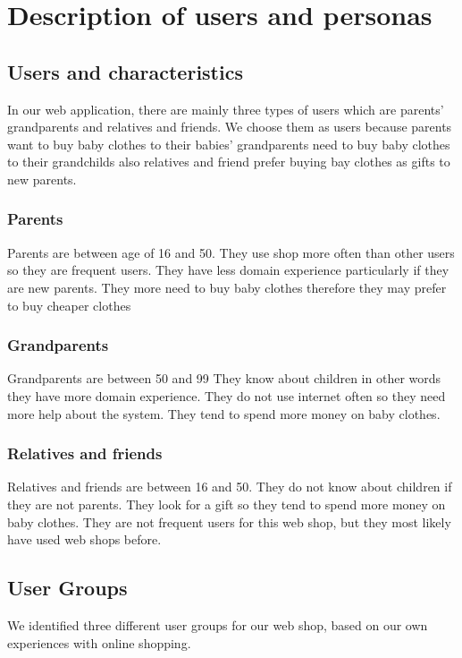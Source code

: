 \section{Description of users and personas}
\subsection{Users and characteristics}

In our web application, there are mainly three types of users which are parents' grandparents and relatives and friends. We choose them as users because parents want to buy baby clothes to their babies' grandparents need to buy baby clothes to their grandchilds also relatives and friend prefer buying bay clothes as gifts to new parents.

\subsubsection{Parents}

Parents are between age of 16 and 50. They use shop more often than other users so they are frequent users. They have less domain experience particularly if they are new parents. They more need to buy baby clothes therefore they may prefer to buy cheaper clothes

\subsubsection{Grandparents}

Grandparents are between 50 and 99 They know about children in other words they have more domain experience. 
They do not use internet often so they need more help about the system. They tend to spend more money on baby clothes.

\subsubsection{Relatives and friends}

Relatives and friends are between 16 and 50. They do not know about children if they are not parents. They look for a gift so they tend to spend more money on baby clothes. They are not frequent users for this web shop, but they most likely have used web shops before.


\subsection{User Groups}
We identified three different user groups for our web shop, based on our own experiences with online shopping.
 
